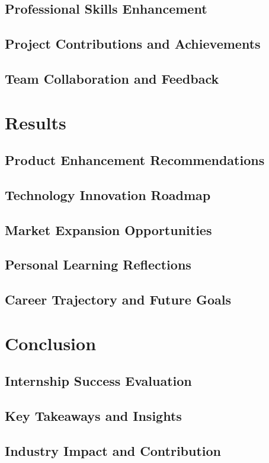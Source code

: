 \documentclass[a4paper, 11pt, oneside]{report}
\begin{document}
\section{Professional Skills Enhancement}
\section{Project Contributions and Achievements}
\section{Team Collaboration and Feedback}


\chapter{Results}
\section{Product Enhancement Recommendations}
\section{Technology Innovation Roadmap}
\section{Market Expansion Opportunities}
\section{Personal Learning Reflections}
\section{Career Trajectory and Future Goals}


\chapter{Conclusion}
\section{Internship Success Evaluation}
\section{Key Takeaways and Insights}
\section{Industry Impact and Contribution}
\end{document}
